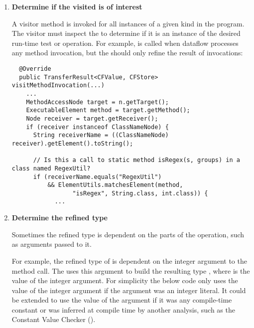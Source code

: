 \begin{enumerate}
\item \textbf{Determine if the visited  is of
    interest}

A visitor method is invoked for all
instances of a given  kind in the
program.
The visitor must inspect the
 to determine if it is an
instance of the desired run-time test or operation.  For example,
 is called when dataflow processes any method
invocation, but the  should only refine
the result of  invocations:

\begin{smaller}
\begin{Verbatim}
  @Override
  public TransferResult<CFValue, CFStore> visitMethodInvocation(...)
    ...
    MethodAccessNode target = n.getTarget();
    ExecutableElement method = target.getMethod();
    Node receiver = target.getReceiver();
    if (receiver instanceof ClassNameNode) {
      String receiverName = ((ClassNameNode) receiver).getElement().toString();

      // Is this a call to static method isRegex(s, groups) in a class named RegexUtil?
      if (receiverName.equals("RegexUtil")
          && ElementUtils.matchesElement(method,
                 "isRegex", String.class, int.class)) {
            ...
\end{Verbatim}
\end{smaller}

\item \textbf{Determine the refined type}

Sometimes the refined type is dependent on the parts of the operation,
such as arguments passed to it.

For example, the refined type of  is dependent on the
integer argument to the method call. The 
uses this argument to build the resulting type , where 
is the value of the integer argument.  For simplicity the below code only uses
the value of the integer argument if the argument was an integer literal.  It
could be extended to use the value of the argument if it was any compile-time
constant or was inferred at compile time by another analysis, such as the
Constant Value Checker ().


\end{enumerate}
